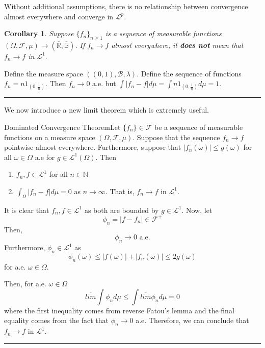\documentclass[twoside]{article}
\newtheorem{corollary}[theorem]{Corollary}
\newenvironment{proof}{{\bf Proof:}}{\hfill\rule{2mm}{2mm}}
\newcommand{\sigmalgebra}{\mathcal{F}}
\newcommand{\borelsigmaalgebra}{\mathcal{B}}
\begin{document}
Without additional assumptions, there is no relationship between convergence almost everywhere and converge in $\mathcal{L}^p.$
\begin{corollary}Suppose $\{f_n\}_{n \geq 1}$ is a sequence of measurable functions $(\Omega, \sigmalgebra, \mu) \rightarrow (\overline{\mathbb{R}}, \overline{\mathbb{B}})$. If $f_n \rightarrow f$ almost everywhere, it \textbf{does not} mean that $f_n \rightarrow f$ in $\mathcal{L}^1.$
\end{corollary}

\begin{proof} Define the measure space $((0,1), \borelsigmaalgebra, \lambda)$. Define the sequence of functions $f_n = n1_{(0,\frac{1}{n})}$. Then $f_n \rightarrow 0$ a.e. but $\int|f_n - f|d\mu = \int n1_{(0,\frac{1}{n})}d\mu = 1.$
\end{proof}


We now introduce a new limit theorem which is extremely useful.

\begin{theorem_exam}{Dominated Convergence Theorem}{}Let $\{f_n\} \in \sigmalgebra$ be a sequence of measurable functions on a measure space $(\Omega, \sigmalgebra, \mu)$. Suppose that the sequence $f_n \rightarrow f$ pointwise almost everywhere. Furthermore, suppose that $|f_n(\omega)| \leq g(\omega)$ for all $\omega \in \Omega$ a.e for $g \in \mathcal{L}^1(\Omega)$. Then
\begin{enumerate}
\item $f_n, f \in \mathcal{L}^1$ for all $n \in \mathbb{N}$ 
\item $\int_{\Omega}|f_n - f|d\mu = 0$ as $n \rightarrow \infty$. That is, $f_n \rightarrow f$ in $\mathcal{L}^1.$
\end{enumerate}
\end{theorem_exam}

\begin{proof} It is clear that $f_n, f \in \mathcal{L}^1$ as both are bounded by $g \in \mathcal{L}^1.$ Now, let 
$$
\phi_n = |f - f_n| \in \sigmalgebra^+
$$
Then, 
$$
\phi_n \rightarrow 0 \text{ a.e.}
$$
Furthermore, $\phi_n \in \mathcal{L}^1$ as 
$$
\phi_n(\omega) \leq |f(\omega)| + |f_n(\omega)| \leq 2g(\omega)
$$
for a.e. $\omega \in \Omega.$

Then, for a.e. $\omega \in \Omega$
$$
\overline{lim}\int \phi_nd\mu \leq \int \overline{lim} \phi_nd\mu = 0
$$
where the first inequality comes from reverse Fatou's lemma and the final equality comes from the fact that $\phi_n \rightarrow 0$ a.e. Therefore, we can conclude that $f_n \rightarrow f$ in $\mathcal{L}^1.$
\end{proof}
\end{document}
